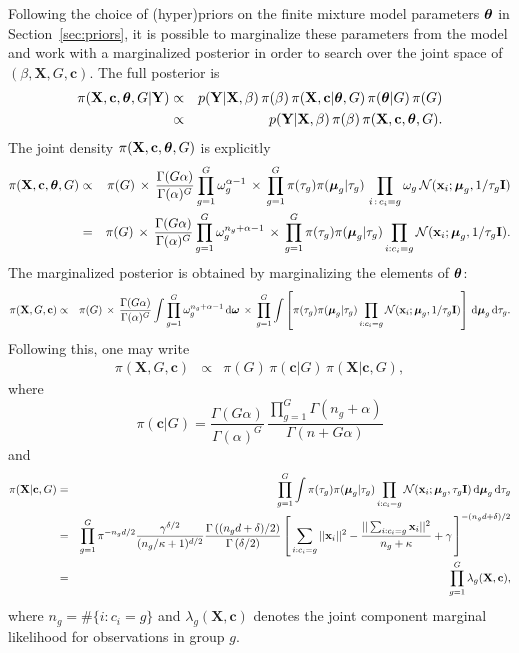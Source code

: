 \documentclass[12pt]{article}
\newcommand{\x}{{\mathbf{x}}}
\newcommand{\bX}{{\mathbf{X}}}
\newcommand{\Y}{{\mathbf{Y}}}
\newcommand{\bc}{{\mathbf{c}}}
\newcommand{\I}{{\mathbf{I}}}
\newcommand{\diff}{\mathrm{d}}
\newcommand{\bftheta}{\hbox{\boldmath$\theta$}}
\newcommand{\bfomega}{\hbox{\boldmath$\omega$}}
\newcommand{\bfmu}{\hbox{\boldmath$\mu$}}
\begin{document}
Following the choice of (hyper)priors on the finite mixture model parameters $\bftheta$ in Section~\ref{sec:priors}, it is possible to marginalize these parameters from the model and work with a marginalized posterior in order to search over the joint space of $(\beta, \bX, G, \bc)$. The full posterior is 
\begin{eqnarray*}
\pi(\bX,\bc,\bftheta,G|\Y) &\propto& p(\Y|\bX,\beta)\, \pi( \beta ) \, \pi( \bX,\bc | \bftheta,  G )   \, \pi( \bftheta | G )\,  \pi( G ) \\
&\propto& p(\Y|\bX,\beta)\, \pi( \beta ) \, \pi( \bX,\bc, \bftheta,  G ).
\end{eqnarray*} 
The joint density $\pi( \bX,\bc, \bftheta,  G )$ is explicitly
\begin{eqnarray*}
\pi( \bX,\bc, \bftheta,  G ) & \propto & \pi(G)\, \times \,\frac{\Gamma(G\alpha)}{\Gamma(\alpha)^G} \prod_{g=1}^G \omega_g^{\alpha-1}\,\times \,\prod_{g=1}^G\pi(\tau_g) \pi(\bfmu_g|\tau_g) \,\prod_{i\, : \,c_i = g} \omega_g \, \mathcal{N}(\x_i ;  \bfmu_g, 1/\tau_g \I) \\
& = & \pi(G) \,\times\, \frac{\Gamma(G\alpha)}{\Gamma(\alpha)^G} \prod_{g=1}^G \omega_g^{n_g + \alpha-1}\,\times\, \prod_{g=1}^G \pi(\tau_g) \pi(\bfmu_g|\tau_g) \prod_{i:c_i=g} \mathcal{N}( \x_i; \bfmu_{g}, 1/\tau_{g} \mathbf{I} ).
\end{eqnarray*}
The marginalized posterior is obtained by marginalizing the elements of $\bftheta$:
\begin{eqnarray*}
\pi(\bX,G , \bc  ) &\propto & \pi( G) \,\times\, \frac{\Gamma(G\alpha)}{\Gamma(\alpha)^G} \int \prod_{g=1}^G \omega_g^{n_g + \alpha-1} \,\diff \bfomega  \,\times\, \prod_{g=1}^G \int\left[ \pi(\tau_g) \pi(\bfmu_g|\tau_g) \prod_{i:c_i=g} \mathcal{N}( \x_i; \bfmu_{g}, 1/\tau_{g} \mathbf{I} ) \right]\, \diff \bfmu_g \, \diff \tau_g .\\
\end{eqnarray*}
Following this, one may write
\begin{eqnarray*}
\pi(\bX,G , \bc  ) &\propto & \pi(G)\, \pi(\bc | G ) \, \pi(\bX | \bc,  G ),
\end{eqnarray*}
where 
\[
\pi(\bc | G ) = \frac{\Gamma( G \alpha )}{\Gamma(\alpha)^G }\, \frac{\prod_{g=1}^G \Gamma(n_g + \alpha)}{\Gamma(n + G \alpha)}
\]
and 
\begin{eqnarray*}
\pi(\bX| \bc,  G ) & = & \prod_{g=1}^G  \int \pi(\tau_g) \pi(\bfmu_g| \tau_g) \prod_{i:c_i = g} \mathcal{N}(\x_i; \bfmu_g,  \tau_g \I ) \,\diff \bfmu_g \,\diff \tau_g  \\
& = & \prod_{g=1}^G \pi^{-n_g d / 2}\frac{\gamma^{\delta/2}}{ (n_g / \kappa + 1) ^{d/2}} \frac{\Gamma\left((n_g d + \delta)/2\right)}{\Gamma\left(\delta/2\right)}  \left[\, \sum_{i:c_i=g} || \x_i ||^2 - \frac{|| \sum_{i:c_i = g} \x_i ||^2}{n_g + \kappa}  + \gamma\, \right]^{-(n_g d + \delta)/2}\\
& =& \prod_{g=1}^G \lambda_g( \bX,\bc ),
\end{eqnarray*}
where $n_g = \#\{i : c_i =g\}$ and $\lambda_g(\bX,\bc)$ denotes the joint component marginal likelihood for observations in group $g$. 
\end{document}
